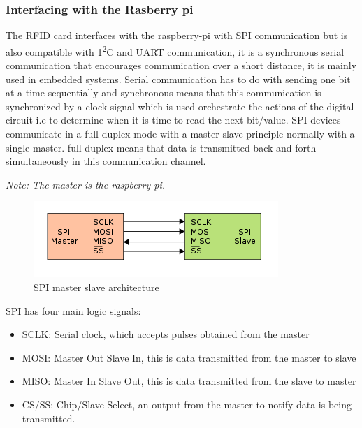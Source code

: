 \subsubsection{Interfacing with the Rasberry pi}
The RFID card interfaces with the raspberry-pi with SPI communication but is also compatible with 1\textsuperscript{2}C and UART communication, it is a synchronous serial communication that encourages communication over a short distance, it is mainly used in embedded systems. Serial communication has to do with sending one bit at a time sequentially and synchronous means that this communication is synchronized by a clock signal which is used orchestrate the actions of the digital circuit i.e to determine when it is time to read the next bit/value. SPI devices communicate in a full duplex mode with a master-slave principle normally with a single master. full duplex means that data is transmitted back and forth simultaneously in this communication channel.

\textit{Note: The master is the raspberry pi.}
\vspace{1cm}
\begin{figure}[h]
  \includegraphics{Background/images/350px-SPI_single_slave.svg.png.png}
  \caption{SPI master slave architecture}
\end{figure}

SPI has four main logic signals: 
\begin{itemize}
  \item SCLK: Serial clock, which accepts pulses obtained from the master
  \item MOSI: Master Out Slave In, this is data transmitted from the master to slave
  \item MISO: Master In Slave Out, this is data transmitted from the slave to master
  \item CS/SS: Chip/Slave Select, an output from the master to notify data is being transmitted.
\end{itemize}

